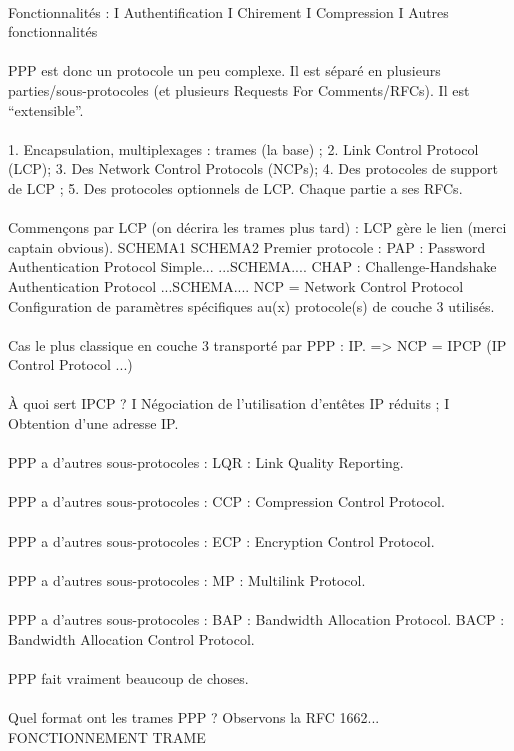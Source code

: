 \documentclass[5pt]{article}
\begin{document}
\begin{scriptsize}
\\
Fonctionnalités : I Authentification I Chirement I Compression I Autres fonctionnalités\\
\\
PPP est donc un protocole un peu complexe. Il est séparé en plusieurs parties/sous-protocoles (et plusieurs Requests For Comments/RFCs). Il est “extensible”.\\
\\
1. Encapsulation, multiplexages : trames (la base) ; 2. Link Control Protocol (LCP); 3. Des Network Control Protocols (NCPs); 4. Des protocoles de support de LCP ; 5. Des protocoles optionnels de LCP. Chaque partie a ses RFCs.\\
\\
Commençons par LCP (on décrira les trames plus tard) : LCP gère le lien (merci captain obvious).
SCHEMA1
SCHEMA2
Premier protocole : PAP : Password Authentication Protocol Simple...
...SCHEMA....
CHAP : Challenge-Handshake Authentication Protocol
...SCHEMA....
NCP = Network Control Protocol Configuration de paramètres spécifiques au(x) protocole(s) de couche 3 utilisés.\\
\\
Cas le plus classique en couche 3 transporté par PPP : IP. => NCP = IPCP (IP Control Protocol ...)\\
\\
À quoi sert IPCP ? I Négociation de l’utilisation d’entêtes IP réduits ; I Obtention d’une adresse IP.\\
\\
PPP a d’autres sous-protocoles : LQR : Link Quality Reporting.\\
\\
PPP a d’autres sous-protocoles : CCP : Compression Control Protocol.\\
\\
PPP a d’autres sous-protocoles : ECP : Encryption Control Protocol.\\
\\
PPP a d’autres sous-protocoles : MP : Multilink Protocol.\\
\\
PPP a d’autres sous-protocoles : BAP : Bandwidth Allocation Protocol. BACP : Bandwidth Allocation Control Protocol.\\
\\
PPP fait vraiment beaucoup de choses.\\
\\
Quel format ont les trames PPP ? Observons la RFC 1662...\\
FONCTIONNEMENT TRAME\\
\\

\end{scriptsize}
\end{document}
